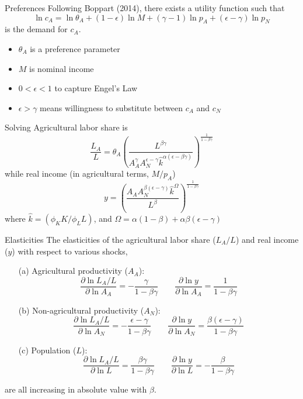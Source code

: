\documentclass[10pt, xcolor=dvipsnames]{beamer}
\begin{document}
\begin{frame}{Preferences}
Following Boppart (2014), there exists a utility function such that
\begin{equation}
    \ln c_A = \ln \theta_A + (1-\epsilon) \ln M + (\gamma - 1) \ln p_A + (\epsilon - \gamma) \ln p_N \label{EQ_ca_demand}
\end{equation}
is the demand for $c_A$.
\begin{itemize}
  \item $\theta_A$ is a preference parameter
  \item $M$ is nominal income
  \item $0 < \epsilon < 1$ to capture Engel's Law
  \item $\epsilon > \gamma$ means willingness to substitute between $c_A$ and $c_N$
\end{itemize}
\end{frame}

\begin{frame}{Solving}
Agricultural labor share is
\begin{equation}
  \frac{L_A}{L} = \theta_A \left(\frac{L^{\beta\gamma}}{A_A^{\gamma} A_N^{\epsilon - \gamma} \hat{k}^{\alpha(\epsilon - \beta\gamma)}}\right)^{\frac{1}{1-\beta\gamma}} \label{EQ_LAL}
\end{equation}
while real income (in agricultural terms, $M/p_A$)
\begin{equation}
  y = \left(\frac{A_A A_N^{\beta(\epsilon-\gamma)}\hat{k}^{\Omega}}{L^{\beta}} \right)^{\frac{1}{1-\beta\gamma}} \label{EQ_y}
\end{equation}
where $\hat{k} = (\phi_K K/\phi_L L)$, and $\Omega = \alpha(1-\beta) + \alpha\beta(\epsilon-\gamma)$
\end{frame}

\begin{frame}{Elasticities}
The elasticities of the agricultural labor share ($L_A/L$) and real income ($y$) with respect to various shocks,
\begin{enumerate}
  \item[(a)] Agricultural productivity ($A_A$): 
\begin{equation}
  \frac{\partial \ln L_A/L}{\partial \ln A_A} = - \frac{\gamma}{1-\beta\gamma} \quad \quad \frac{\partial \ln y}{\partial \ln A_A} = \frac{1}{1-\beta\gamma}
\end{equation}
  \item[(b)] Non-agricultural productivity ($A_N$): 
\begin{equation}
  \frac{\partial \ln L_A/L}{\partial \ln A_N} = - \frac{\epsilon-\gamma}{1-\beta\gamma} \quad \quad \frac{\partial \ln y}{\partial \ln A_N} = \frac{\beta(\epsilon-\gamma)}{1-\beta\gamma}
\end{equation}
  \item[(c)] Population ($L$): 
\begin{equation}
  \frac{\partial \ln L_A/L}{\partial \ln L} = \frac{\beta\gamma}{1-\beta\gamma} \quad \quad \frac{\partial \ln y}{\partial \ln L} = - \frac{\beta}{1-\beta\gamma}
\end{equation}
\end{enumerate}
are all increasing in absolute value with $\beta$.
\end{frame}
\end{document}
